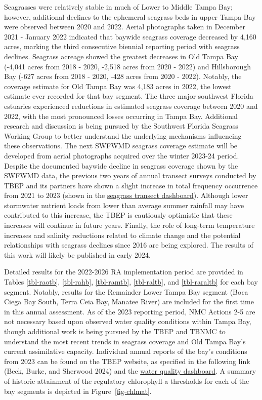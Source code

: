 \documentclass[
  letterpaper,
  DIV=11,
  numbers=noendperiod]{scrreport}
\begin{document}
Seagrasses were relatively stable in much of Lower to Middle Tampa Bay;
however, additional declines to the ephemeral seagrass beds in upper
Tampa Bay were observed between 2020 and 2022. Aerial photographs taken
in December 2021 - January 2022 indicated that baywide seagrass coverage
decreased by 4,160 acres, marking the third consecutive biennial
reporting period with seagrass declines. Seagrass acreage showed the
greatest decreases in Old Tampa Bay (-4,041 acres from 2018 - 2020,
-2,518 acres from 2020 - 2022) and Hillsborough Bay (-627 acres from
2018 - 2020, -428 acres from 2020 - 2022). Notably, the coverage
estimate for Old Tampa Bay was 4,183 acres in 2022, the lowest estimate
ever recorded for that bay segment. The three major southwest Florida
estuaries experienced reductions in estimated seagrass coverage between
2020 and 2022, with the most pronounced losses occurring in Tampa Bay.
Additional research and discussion is being pursued by the Southwest
Florida Seagrass Working Group to better understand the underlying
mechanisms influencing these observations. The next SWFWMD seagrass
coverage estimate will be developed from aerial photographs acquired
over the winter 2023-24 period. Despite the documented baywide decline
in seagrass coverage shown by the SWFWMD data, the previous two years of
annual transect surveys conducted by TBEP and its partners have shown a
slight increase in total frequency occurrence from 2021 to 2023 (shown
in the \href{https://shiny.tbep.org/seagrasstransect-dash}{seagrass
transect dashboard}). Although lower stormwater nutrient loads from
lower than average summer rainfall may have contributed to this
increase, the TBEP is cautiously optimistic that these increases will
continue in future years. Finally, the role of long-term temperature
increases and salinity reductions related to climate change and the
potential relationships with seagrass declines since 2016 are being
explored. The results of this work will likely be published in early
2024.

Detailed results for the 2022-2026 RA implementation period are provided
in Tables \ref{tbl-raotb}, \ref{tbl-rahb}, \ref{tbl-ramtb},
\ref{tbl-raltb}, and \ref{tbl-raraltb} for each bay segment. Notably,
results for the Remainder Lower Tampa Bay segment (Boca Ciega Bay South,
Terra Ceia Bay, Manatee River) are included for the first time in this
annual assessment. As of the 2023 reporting period, NMC Actions 2-5 are
not necessary based upon observed water quality conditions within Tampa
Bay, though additional work is being pursued by the TBEP and TBNMC to
understand the most recent trends in seagrass coverage and Old Tampa
Bay's current assimilative capacity. Individual annual reports of the
bay's conditions from 2023 can be found on the TBEP website, as
specified in the following link (Beck, Burke, and Sherwood 2024) and the
\href{https://shiny.tbep.org/wq-dash}{water quality dashboard}. A
summary of historic attainment of the regulatory chlorophyll-a
thresholds for each of the bay segments is depicted in
Figure~\ref{fig-chlmat}.
\end{document}
